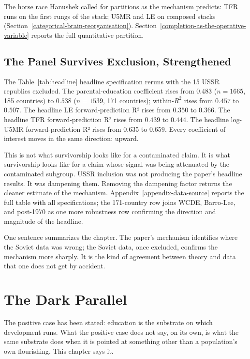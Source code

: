 \documentclass[12pt,letterpaper]{article}
\begin{document}
The horse race Hanushek called for partitions as the mechanism
predicts: TFR runs on the first rungs of the stack; U5MR and LE on
composed stacks (Section~\ref{categorical-brain-reorganisation}).
Section~\ref{completion-as-the-operative-variable} reports the full
quantitative partition.

\subsection{The Panel Survives Exclusion, Strengthened}\label{exclusion-robustness}

The Table~\ref{tab:headline} headline specification reruns with the 15 USSR
republics excluded. The parental-education coefficient rises from
$0.483$ ($n = 1665$, 185 countries) to $0.538$ ($n = 1539$, 171
countries); within-$R^2$ rises from $0.457$ to $0.507$. The headline
LE forward-prediction R² rises from $0.350$ to $0.366$. The headline
TFR forward-prediction R² rises from $0.439$ to $0.444$. The headline
log-U5MR forward-prediction R² rises from $0.635$ to $0.659$. Every
coefficient of interest moves in the same direction: upward.

This is not what survivorship looks like for a contaminated claim.
It is what survivorship looks like for a claim whose signal was being
attenuated by the contaminated subgroup. USSR inclusion was not
producing the paper's headline results. It was dampening them.
Removing the dampening factor returns the cleaner estimate of the
mechanism. Appendix~\ref{appendix-data-source}
reports the full table with all specifications; the 171-country row
joins WCDE, Barro-Lee, and post-1970 as one more robustness row
confirming the direction and magnitude of the headline.

One sentence summarizes the chapter. The paper's mechanism identifies
where the Soviet data was wrong; the Soviet data, once excluded,
confirms the mechanism more sharply. It is the kind of agreement
between theory and data that one does not get by accident.


\section{The Dark Parallel}\label{the-dark-parallel}

The positive case has been stated: education is the substrate on which
development runs. What the positive case does not say, on its own, is
what the same substrate does when it is pointed at something other than
a population's own flourishing. This chapter says it.
\end{document}
